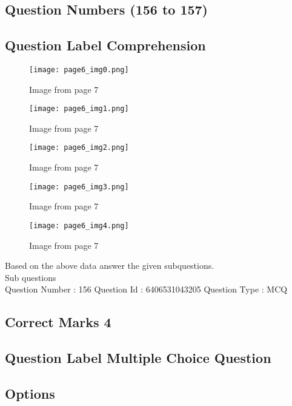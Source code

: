 \documentclass{article}
\begin{document}
\subsection{Question Numbers  (156 to 157)}

\subsection{Question Label  Comprehension}

\newpage
\begin{figure}[h]
\centering
\texttt{[image: page6\_img0.png]}
\caption{Image from page 7}
\end{figure}

\begin{figure}[h]
\centering
\texttt{[image: page6\_img1.png]}
\caption{Image from page 7}
\end{figure}

\begin{figure}[h]
\centering
\texttt{[image: page6\_img2.png]}
\caption{Image from page 7}
\end{figure}

\begin{figure}[h]
\centering
\texttt{[image: page6\_img3.png]}
\caption{Image from page 7}
\end{figure}

\begin{figure}[h]
\centering
\texttt{[image: page6\_img4.png]}
\caption{Image from page 7}
\end{figure}

Based on the above data answer the given subquestions.\\

Sub questions\\

Question Number : 156 Question Id : 6406531043205 Question Type : MCQ\\

\subsection{Correct Marks  4}

\subsection{Question Label  Multiple Choice Question}

\subsection{Options }
\end{document}
